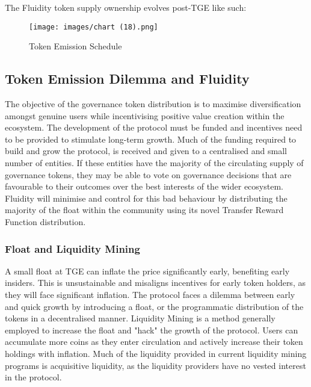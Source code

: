 \vspace{1em}

\newpage

The Fluidity token supply ownership evolves post-TGE like such:

\begin{figure}[h]
    \centering
    \texttt{[image: images/chart (18).png]}
    \caption{Token Emission Schedule}
\end{figure}


\subsection{Token Emission Dilemma and Fluidity}

The objective of the governance token distribution is to maximise diversification amongst genuine users while incentivising positive value creation within the ecosystem. The development of the protocol must be funded and incentives need to be provided to stimulate long-term growth. Much of the funding required to build and grow the protocol, is received and given to a centralised and small number of entities. If these entities have the majority of the circulating supply of governance tokens, they may be able to vote on governance decisions that are favourable to their outcomes over the best interests of the wider ecosystem. Fluidity will minimise and control for this bad behaviour by distributing the majority of the float within the community using its novel Transfer Reward Function distribution.

\subsubsection{Float and Liquidity Mining}
A small float at TGE can inflate the price significantly early, benefiting early insiders. This is unsustainable and misaligns incentives for early token holders, as they will face significant inflation. The protocol faces a dilemma between early and quick growth by introducing a float, or the programmatic distribution of the tokens in a decentralised manner. Liquidity Mining is a method generally employed to increase the float and "hack" the growth of the protocol. Users can accumulate more coins as they enter circulation and actively increase their token holdings with inflation. Much of the liquidity provided in current liquidity mining programs is acquisitive liquidity, as the liquidity providers have no vested interest in the protocol.

